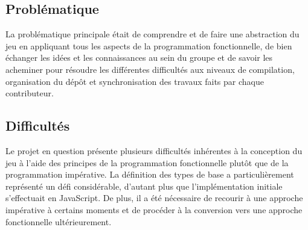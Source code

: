 \documentclass[11pt]{article}
\begin{document}
        \subsection {Problématique}
             La problématique principale était de comprendre et de faire une abstraction du jeu en appliquant tous les aspects de la programmation fonctionnelle, de bien échanger les idées et les connaissances au sein du groupe et de savoir les acheminer pour résoudre les différentes difficultés aux niveaux de compilation, organisation du dépôt et synchronisation des travaux faits par chaque contributeur. 
        \subsection{Difficultés}
            Le projet en question présente plusieurs difficultés inhérentes à la conception du jeu à l'aide des principes de la programmation fonctionnelle plutôt que de la programmation impérative. La définition des types de base a particulièrement représenté un défi considérable, d'autant plus que l'implémentation initiale s'effectuait en JavaScript. De plus, il a été nécessaire de recourir à une approche impérative à certains moments et de procéder à la conversion vers une approche fonctionnelle ultérieurement.
\end{document}

